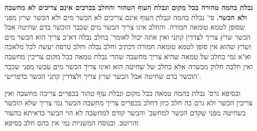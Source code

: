 \documentclass[12pt, openany]{book}
\newcommand{\sethebfont}{
\fontsize{10.5pt}{21.0pt} \selectfont
}
\newcommand{\twocol}[1]{
	{\sethebfont \begin{multicols}{2}
			#1
	\end{multicols}}	
}
\newcommand{\textblock}[1]{
{\sethebfont #1\\}	
}
\begin{document}
\twocol{\textbf{נבלת בהמה טהורה בכל מקום ונבלת העוף הטהור והחלב בכרכים אינם צריכים לא מחשבה ולא הכשר.}  פי' נבלת בהמה ונבלת העוף אינם צריכים לא הכשר מים ולא הכשר שרץ מפני שסופן לטמא טומאה חמורה. והחלב אינו צריך הכשר מים שכבר הוכשר בדם שחיטה אבל הכשר שרץ צריך לצדדין קתני ואין אתה יכול לאומר' בחלב נבלה דא"כ צריך הוא הכשר מים ושרץ שהוא אין סופו לטמא טומאה חמורה דכתיב וחלב נבלה וחלב טרפה יעשה לכל מלאכה וא"א נמי בחלב של טמאה שהיא צריך מחשבה שהרי נבלת טמאה בכל מקום צריכין מחשבה ואין חלבה חלוק מבשרה אלא בחלב של שחיטה הוא ואינו צריך הכשר מים עכשו מפני שכבר הוכשר בדם שחיטה אבל הכשר שרץ צריך ולצדדין קתני הכשר כדפרישי'.\par  ובסיפא גרס' נבלת בהמה טמאה בכל מקום ונבלת עוף טהור בכפרים צריכה מחשבה ואין צריכין הכשר ולא גרם בה חלב כיון דחלב בכפרים צריך מחשבה הכשר נמי צריך שלא הוכשר בשחיטה מפני שקדם הכשר למחשב' והבשר קודם למחשבה לא הוי הבשר כדאיתא בהעור והרוטב. ובנוסח המשניות נמי אין בהם חלב בסיפא. 
\par}
\textblock{}{}
\end{document}
